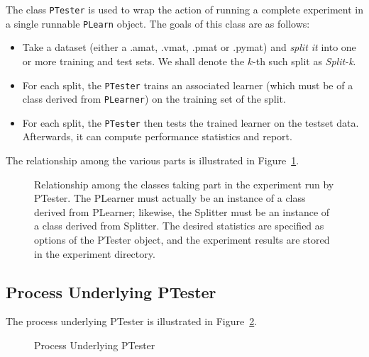 \documentclass[11pt]{book}
\begin{document}
\iffalse

The class \verb|PTester| is used to wrap the action of running a complete
experiment in a single runnable \verb|PLearn| object.  The goals of this
class are as follows:

  \begin{itemize}
  \item Take a dataset (either a .amat, .vmat, .pmat or .pymat) and
    \emph{split it} into one or more training and test sets.  We shall
    denote the $k$-th such split as \emph{Split-k}.

  \item For each split, the \verb|PTester| trains an associated learner
    (which must be of a class derived from \verb|PLearner|) on the training
    set of the split.

  \item For each split, the \verb|PTester| then tests the trained learner
    on the testset data.  Afterwards, it can compute performance statistics
    and report.
  \end{itemize}

The relationship among the various parts is illustrated in
Figure~\ref{fig:ptesteroverall}.

\begin{figure}
  \centering
  \caption{Relationship among the classes taking part in the experiment run
    by PTester.  The PLearner must actually be an instance of a class
    derived from PLearner; likewise, the Splitter must be an instance of a
    class derived from Splitter.  The desired statistics are specified as
    options of the PTester object, and the experiment results are stored in
    the experiment directory.}
\label{fig:ptesteroverall}
\end{figure}

\subsection{Process Underlying PTester}

The process underlying PTester is illustrated in
Figure~\ref{fig:ptesterprocess}.

\begin{figure}
  \centering
  \caption{Process Underlying PTester}
  \label{fig:ptesterprocess}
\end{figure}
\end{document}
